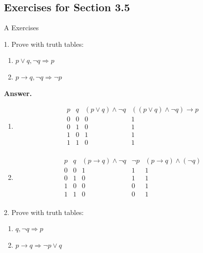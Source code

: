 \documentclass[10pt,]{book}
\theoremstyle{plain}
\theoremstyle{definition}
\theoremstyle{definition}
\theoremstyle{definition}
\theoremstyle{definition}
\begin{document}
\subsection[Exercises for Section 3.5 ]{Exercises for Section 3.5 }\label{exercises-3.5}
\hypertarget{exercisegroup-6}{}\typeout{************************************************}
\typeout{************************************************}
A Exercises%
\begin{exercisegroup}
\item[1.]\hypertarget{exercise-24}{} Prove with truth tables:%
\par
\leavevmode%
\begin{enumerate}[label=\alph*]
\item\hypertarget{li-113}{} \(p\lor  q, \neg q\Rightarrow  p\)%
\item\hypertarget{li-114}{} \(p \rightarrow  q, \neg q \Rightarrow  \neg p\)%
\end{enumerate}

%
\par\smallskip
\par\smallskip
\noindent\textbf{Answer.}\hypertarget{answer-11}{}\quad
\leavevmode%
\begin{enumerate}[label=\alph*]
\item\hypertarget{li-115}{}  
\[
 \begin{array}{cccc}
 p & q &  (p\lor q)\land \neg q & ((p\lor q)\land \neg q)\to p \\
 0 & 0 & 0 & 1 \\
 0 & 1 & 0 & 1 \\
 1 & 0 & 1 & 1 \\
 1 & 1 & 0 & 1 \\
\end{array}
\] %
\item\hypertarget{li-116}{} \[\begin{array}{ccccc}
 p & q  & (p\to q)\land \neg q & \neg p & (p\to q)\land (\neg q) \\
 0 & 0 & 1 & 1 & 1 \\
 0 & 1 & 0 & 1 & 1 \\
 1 & 0 & 0 & 0 & 1 \\
 1 & 1 & 0 & 0 & 1 \\
\end{array}\]%
\end{enumerate}
%
\item[2.]\hypertarget{exercise-25}{} Prove with truth tables:%
\par
\leavevmode%
\begin{enumerate}[label=\alph*]
\item\hypertarget{li-117}{} \(q, \neg q\Rightarrow  p\)%
\item\hypertarget{li-118}{}  \(p \rightarrow  q \Rightarrow  \neg p \lor  q\)%
\end{enumerate}

%
\par\smallskip
\end{exercisegroup}
\end{document}
